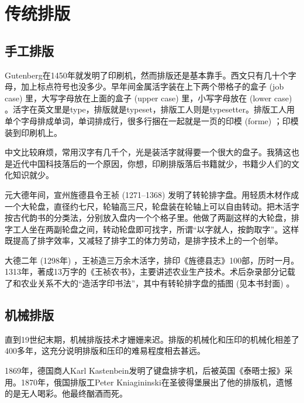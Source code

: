 \section{传统排版}

\subsection{手工排版}

Gutenberg在1450年就发明了印刷机，然而排版还是基本靠手。西文只有几十个字母，加上标点符号也没多少。早年间金属活字装在上下两个带格子的盒子 (job case) 里，大写字母放在上面的盒子 (upper case) 里，小写字母放在 (lower case) 。活字在英文里是type，排版就是typeset，排版工人则是typesetter。排版工人用单个字母排成单词，单词排成行，很多行捆在一起就是一页的印模 (forme) ；印模装到印刷机上。

中文比较麻烦，常用汉字有几千个，光是装活字就得要一个很大的盘子。我猜这也是近代中国科技落后的一个原因，你想，印刷排版落后书籍就少，书籍少人们的文化知识就少。

元大德年间，宣州旌德县令王祯 (1271--1368)\indexWangZhen{} 发明了转轮排字盘。用轻质木材作成一个大轮盘，直径约七尺，轮轴高三尺，轮盘装在轮轴上可以自由转动。把木活字按古代韵书的分类法，分别放入盘内一个个格子里。他做了两副这样的大轮盘，排字工人坐在两副轮盘之间，转动轮盘即可找字，所谓“以字就人，按韵取字”。这样既提高了排字效率，又减轻了排字工的体力劳动，是排字技术上的一个创举。

大德二年 (1298年) ，王祯造三万余木活字，排印《旌德县志》100部，历时一月。1313年，著成13万字的《王祯农书》，主要讲述农业生产技术。术后杂录部分记载了和农业关系不大的“造活字印书法”，其中有转轮排字盘的插图 (见本书封面) 。

\begin{comment}
\begin{figure}[htbp]
\centering
\texttt{[image: movable\_type\_transparent.png]}
\caption{转轮排字盘}
\label{fig:wang}
\end{figure}
\end{comment}

\subsection{机械排版}

直到19世纪末期，机械排版技术才姗姗来迟。排版的机械化和压印的机械化相差了400多年，这充分说明排版和压印的难易程度相去甚远。

1869年，德国商人Karl Kastenbein\indexKastenbein{}发明了键盘排字机，后被英国《泰晤士报》采用。1870年，俄国排版工Peter Kniagininski\indexKniagininski{}在圣彼得堡展出了他的排版机，遗憾的是无人喝彩。他最终酗酒而死。

